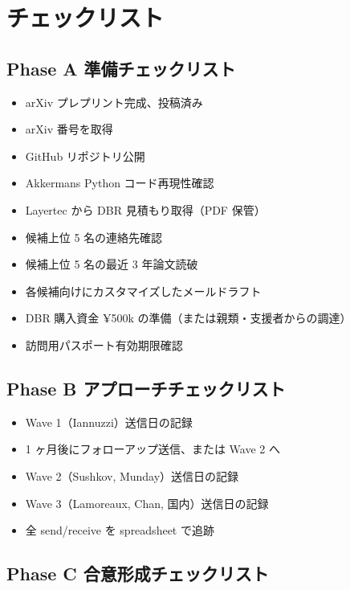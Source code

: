 \documentclass[11pt,a4paper]{article}
\begin{document}
\section{チェックリスト}

\subsection{Phase A 準備チェックリスト}

\begin{itemize}
\item[$\square$] arXiv プレプリント完成、投稿済み
\item[$\square$] arXiv 番号を取得
\item[$\square$] GitHub リポジトリ公開
\item[$\square$] Akkermans Python コード再現性確認
\item[$\square$] Layertec から DBR 見積もり取得（PDF 保管）
\item[$\square$] 候補上位 5 名の連絡先確認
\item[$\square$] 候補上位 5 名の最近 3 年論文読破
\item[$\square$] 各候補向けにカスタマイズしたメールドラフト
\item[$\square$] DBR 購入資金 ¥500k の準備（または親類・支援者からの調達）
\item[$\square$] 訪問用パスポート有効期限確認
\end{itemize}

\subsection{Phase B アプローチチェックリスト}

\begin{itemize}
\item[$\square$] Wave 1（Iannuzzi）送信日の記録
\item[$\square$] 1 ヶ月後にフォローアップ送信、または Wave 2 へ
\item[$\square$] Wave 2（Sushkov, Munday）送信日の記録
\item[$\square$] Wave 3（Lamoreaux, Chan, 国内）送信日の記録
\item[$\square$] 全 send/receive を spreadsheet で追跡
\end{itemize}

\subsection{Phase C 合意形成チェックリスト}
\end{document}
